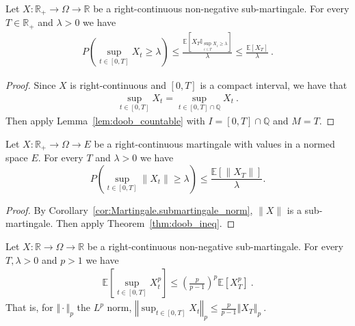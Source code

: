 \begin{theorem}\label{thm:doob_ineq}
  \leanok
  Let $X: \mathbb{R}_+ \to \Omega \to \mathbb{R}$ be a right-continuous non-negative sub-martingale.
  For every $T \in \mathbb{R}_+$ and $\lambda>0$ we have
  \begin{align*}
    P\left( \sup_{t\in[0,T]}X_t \geq \lambda \right)
    \leq \frac{\mathbb{E}[X_T \mathbb{I}_{\sup_{i \le T}X_i \ge \lambda}]}{\lambda}
    \leq \frac{\mathbb{E}[X_T]}{\lambda}
    \: .
  \end{align*}
\end{theorem}

\begin{proof}
Since $X$ is right-continuous and $[0,T]$ is a compact interval, we have that
\begin{align*}
  \sup_{t\in[0,T]}X_t = \sup_{t\in[0,T] \cap \mathbb{Q}}X_t
  \: .
\end{align*}
Then apply Lemma~\ref{lem:doob_countable} with $I = [0,T] \cap \mathbb{Q}$ and $M = T$.
\end{proof}


\begin{corollary}\label{cor:doob_ineq_norm}
  \leanok
  Let $X:\mathbb{R}_+ \to \Omega \to E$ be a right-continuous martingale with values in a normed space $E$.
  For every $T$ and $\lambda>0$ we have
  $$
  P\left( \sup_{t\in[0,T]} \lVert X_t \rVert \geq \lambda \right)
  \leq \frac{\mathbb{E}[\lVert X_T \rVert]}{\lambda}.
  $$
\end{corollary}

\begin{proof}
  By Corollary~\ref{cor:Martingale.submartingale_norm}, $\lVert X \rVert$ is a sub-martingale.
  Then apply Theorem~\ref{thm:doob_ineq}.
\end{proof}


\begin{theorem}\label{thm:doob_lp}
  Let $X:\mathbb{R} \rightarrow \Omega \rightarrow \mathbb{R}$ be a right-continuous non-negative sub-martingale.
  For every $T, \lambda>0$ and $p>1$ we have
  \begin{align*}
    \mathbb{E}\left[ \sup_{t\in[0,T]}X_t^p \right]
    \leq \left(\frac{p}{p-1}\right)^p\mathbb{E}[X_T^p]
    \: .
  \end{align*}
  That is, for $\Vert \cdot \Vert_p$ the $L^p$ norm,
  $\left\Vert \sup_{t\in[0,T]}  X_t  \right\Vert_p
    \leq \frac{p}{p-1} \left\Vert X_T \right\Vert_p
    \: .$
\end{theorem}

